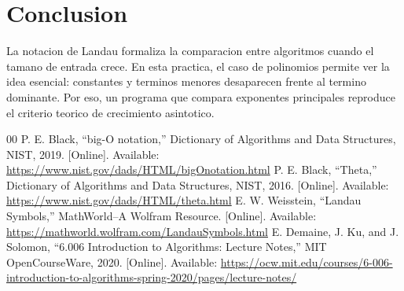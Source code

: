 \documentclass[conference]{IEEEtran}
\begin{document}
\section{Conclusion}
La notacion de Landau formaliza la comparacion entre algoritmos cuando el
tamano de entrada crece. En esta practica, el caso de polinomios permite ver
la idea esencial: constantes y terminos menores desaparecen frente al termino
dominante. Por eso, un programa que compara exponentes principales reproduce
el criterio teorico de crecimiento asintotico.

\begin{thebibliography}{00}
 P. E. Black, ``big-O notation,'' Dictionary of Algorithms and Data Structures, NIST, 2019. [Online]. Available: \url{https://www.nist.gov/dads/HTML/bigOnotation.html}
 P. E. Black, ``Theta,'' Dictionary of Algorithms and Data Structures, NIST, 2016. [Online]. Available: \url{https://www.nist.gov/dads/HTML/theta.html}
 E. W. Weisstein, ``Landau Symbols,'' MathWorld--A Wolfram Resource. [Online]. Available: \url{https://mathworld.wolfram.com/LandauSymbols.html}
 E. Demaine, J. Ku, and J. Solomon, ``6.006 Introduction to Algorithms: Lecture Notes,'' MIT OpenCourseWare, 2020. [Online]. Available: \url{https://ocw.mit.edu/courses/6-006-introduction-to-algorithms-spring-2020/pages/lecture-notes/}
\end{thebibliography}
\end{document}
